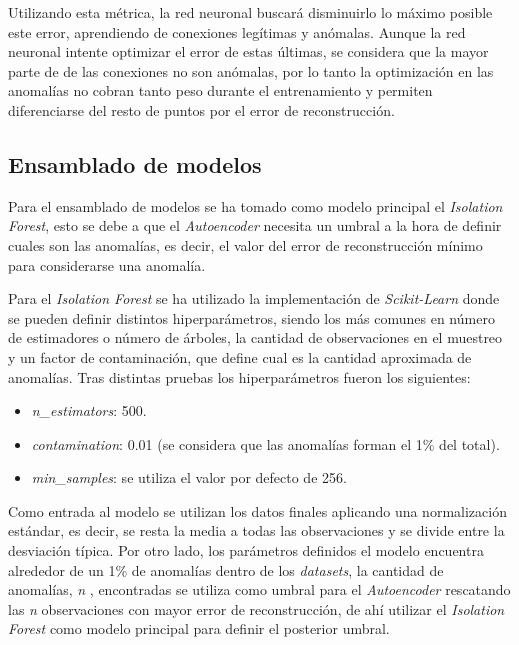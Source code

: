Utilizando esta métrica, la red neuronal buscará disminuirlo lo máximo posible este error, aprendiendo de conexiones legítimas y anómalas. Aunque la red neuronal intente optimizar el error de estas últimas, se considera que la mayor parte de de las conexiones no son anómalas, por lo tanto la optimización en las anomalías no cobran tanto peso durante el entrenamiento y permiten diferenciarse del resto de puntos por el error de reconstrucción.

\subsection{Ensamblado de modelos}

Para el ensamblado de modelos se ha tomado como modelo principal el \textit{Isolation Forest}, esto se debe a que el \textit{Autoencoder} necesita un umbral a la hora de definir cuales son las anomalías, es decir, el valor del error de reconstrucción mínimo para considerarse una anomalía. 

Para el  \textit{Isolation Forest} se ha utilizado la implementación de \textit{Scikit-Learn} donde se pueden definir distintos hiperparámetros, siendo los más comunes en número de estimadores o número de árboles, la cantidad de observaciones en el muestreo y un factor de contaminación, que define cual es la cantidad aproximada de anomalías. Tras distintas pruebas los hiperparámetros fueron los siguientes:

\begin{itemize}
    \item \textit{n\_estimators}: 500.
    \item \textit{contamination}: 0.01 (se considera que las anomalías forman el 1\% del total).
    \item \textit{min\_samples}: se utiliza el valor por defecto de 256.
\end{itemize}

Como entrada al modelo se utilizan los datos finales aplicando una normalización estándar, es decir, se resta la media a todas las observaciones y se divide entre la desviación típica. Por otro lado, los parámetros definidos el modelo encuentra alrededor de un 1\% de anomalías dentro de los \textit{datasets}, la cantidad de anomalías, \textit{n} , encontradas se utiliza como umbral para el \textit{Autoencoder} rescatando las \textit{n} observaciones con mayor error de reconstrucción, de ahí utilizar el \textit{Isolation Forest} como modelo principal para definir el posterior umbral.

